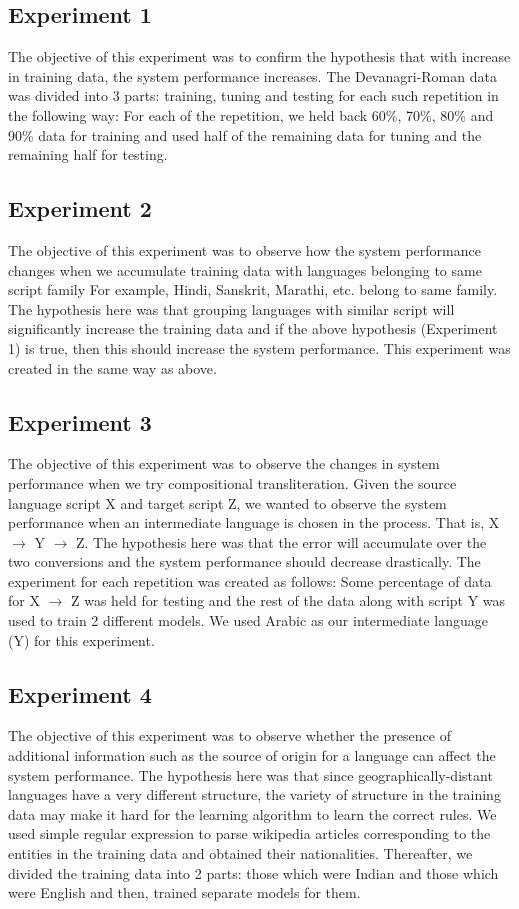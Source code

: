 \documentclass[11pt,a4paper]{article}
\begin{document}
\subsection{Experiment 1}
The objective of this experiment was to confirm the hypothesis that with increase in training data, the system performance increases. The Devanagri-Roman data was divided into 3 parts: training, tuning and testing for each such repetition in the following way: For each of the repetition, we held back 60\%, 70\%, 80\% and 90\% data for training and used half of the remaining data for tuning and the remaining half for testing. 

\subsection{Experiment 2}
The objective of this experiment was to observe how the system performance changes when we accumulate training data with languages belonging to same script family For example, Hindi, Sanskrit, Marathi, etc. belong to same family. The hypothesis here was that grouping languages with similar script will significantly increase the training data and if the above hypothesis (Experiment 1) is true, then this should increase the system performance. This experiment was created in the same way as above.

\subsection{Experiment 3}
The objective of this experiment was to observe the changes in system performance when we try compositional transliteration. Given the source language script X and target script Z, we wanted to observe the system performance when an intermediate language is chosen in the process. That is, X $\to$ Y $\to$ Z. The hypothesis here was that the error will accumulate over the two conversions and the system performance should decrease drastically. The experiment for each repetition was created as follows: Some percentage of data for X $\to$ Z was held for testing and the rest of the data along with script Y was used to train 2 different models. We used Arabic as our intermediate language (Y) for this experiment.

\subsection{Experiment 4}
The objective of this experiment was to observe whether the presence of additional information such as the source of origin for a language can affect the system performance. The hypothesis here was that since geographically-distant languages have a very different structure, the variety of structure in the training data may make it hard for the learning algorithm to learn the correct rules. We used simple regular expression to parse wikipedia articles corresponding to the entities in the training data and obtained their nationalities. Thereafter, we divided the training data into 2 parts: those which were Indian and those which were English and then, trained separate models for them.
\end{document}
